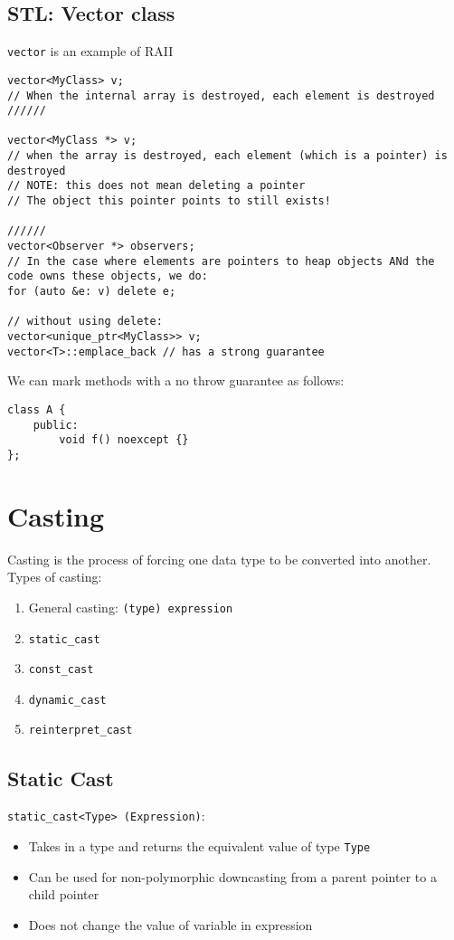 \documentclass[12pt]{article}
\begin{document}
\subsection{STL: Vector class}
\lstinline{vector} is an example of RAII
\begin{lstlisting}
vector<MyClass> v;
// When the internal array is destroyed, each element is destroyed
//////

vector<MyClass *> v;
// when the array is destroyed, each element (which is a pointer) is destroyed
// NOTE: this does not mean deleting a pointer
// The object this pointer points to still exists!

//////
vector<Observer *> observers;
// In the case where elements are pointers to heap objects ANd the code owns these objects, we do:
for (auto &e: v) delete e;

// without using delete:
vector<unique_ptr<MyClass>> v;
vector<T>::emplace_back // has a strong guarantee
\end{lstlisting}

We can mark methods with a no throw guarantee as follows:
\begin{lstlisting}
class A {
    public:
        void f() noexcept {}
};
\end{lstlisting}

\section{Casting}
Casting is the process of forcing one data type to be converted into another. Types of casting:
\begin{enumerate}
    \item General casting: \lstinline{(type) expression}
    \item \lstinline{static_cast}
    \item \lstinline{const_cast}
    \item \lstinline{dynamic_cast}
    \item \lstinline{reinterpret_cast}
\end{enumerate}

\subsection{Static Cast}
\lstinline{static_cast<Type> (Expression)}: 
\begin{itemize}
    \item Takes in a type and returns the equivalent value of type \lstinline{Type}
    \item Can be used for non-polymorphic downcasting from a parent pointer to a child pointer
    \item Does not change the value of variable in expression
\end{itemize}
\end{document}
